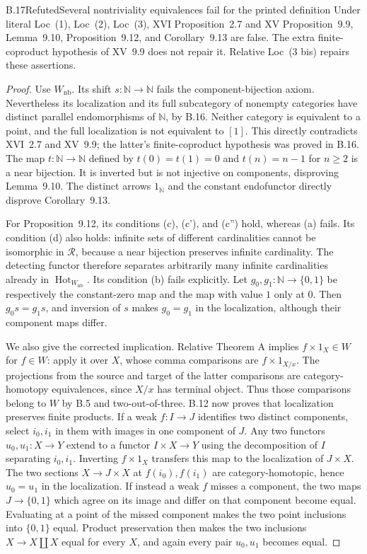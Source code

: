 \begin{claim}{B.17}{Refuted}{Several nontriviality equivalences fail for the printed definition}
Under literal Loc~(1), Loc~(2), Loc~(3), XVI Proposition~2.7
and XV Proposition~9.9, Lemma~9.10, Proposition~9.12, and
Corollary~9.13 are false. The extra finite-coproduct hypothesis
of XV~9.9 does not repair it. Relative Loc~(3 bis) repairs these
assertions.
\end{claim}
\begin{proof}
Use $W_{\mathrm{nb}}$. Its shift $s:\mathbb N\to\mathbb N$
fails the component-bijection axiom. Nevertheless its localization
and its full subcategory of nonempty categories have distinct
parallel endomorphisms of $\mathbb N$, by B.16. Neither category
is equivalent to a point, and the full localization is not
equivalent to $[1]$. This directly contradicts XVI~2.7 and
XV~9.9; the latter's finite-coproduct hypothesis was proved in B.16.
The map $t:\mathbb N\to\mathbb N$ defined by
$t(0)=t(1)=0$ and $t(n)=n-1$ for $n\ge2$ is a near bijection.
It is inverted but is not injective on components, disproving
Lemma~9.10. The distinct arrows $1_{\mathbb N}$ and the constant
endofunctor directly disprove Corollary~9.13.

For Proposition~9.12, its conditions (c), (c'), and (c'') hold,
whereas (a) fails. Its condition (d) also holds: infinite sets of
different cardinalities cannot be isomorphic in $\mathscr R$,
because a near bijection preserves infinite cardinality. The
detecting functor therefore separates arbitrarily many infinite
cardinalities already in $\operatorname{Hot}_{W_{\mathrm{nb}}}$.
Its condition (b) fails explicitly. Let $g_0,g_1:\mathbb N\to\{0,1\}$
be respectively the constant-zero map and the map with value $1$
only at $0$. Then $g_0s=g_1s$, and inversion of $s$ makes
$g_0=g_1$ in the localization, although their component maps differ.

We also give the corrected implication. Relative Theorem A
implies $f\times1_X\in W$ for $f\in W$: apply it over $X$,
whose comma comparisons are $f\times1_{X/x}$.
The projections from the source and target of the latter comparisons
are category-homotopy equivalences, since $X/x$ has terminal object.
Thus those comparisons belong to $W$ by B.5 and two-out-of-three.
B.12 now proves that localization preserves finite products.
If a weak $f:I\to J$ identifies two distinct components, select
$i_0,i_1$ in them with images in one component of $J$. Any two
functors $u_0,u_1:X\to Y$ extend to a functor $I\times X\to Y$
using the decomposition of $I$ separating $i_0,i_1$. Inverting
$f\times1_X$ transfers this map to the localization of $J\times X$.
The two sections $X\to J\times X$ at $f(i_0),f(i_1)$ are
category-homotopic, hence $u_0=u_1$ in the localization.
If instead a weak $f$ misses a component, the two maps
$J\to\{0,1\}$ which agree on its image and differ on that
component become equal. Evaluating at a point of the missed
component makes the two point inclusions into $\{0,1\}$ equal.
Product preservation then makes the two inclusions
$X\to X\amalg X$ equal for every $X$, and again every pair
$u_0,u_1$ becomes equal.


\end{proof}
